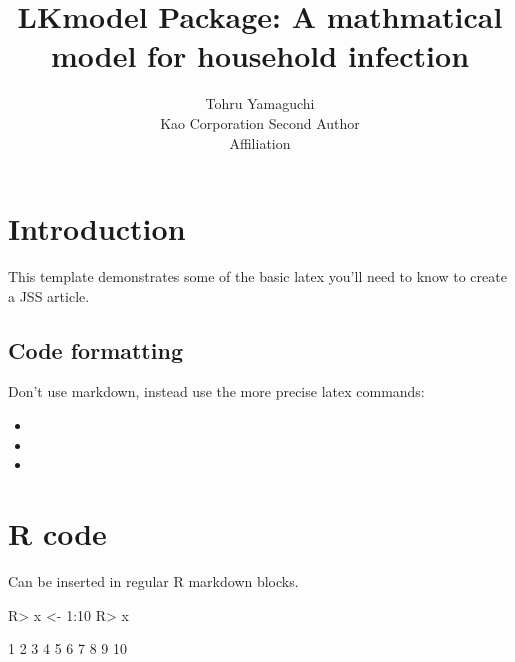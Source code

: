 \documentclass[article]{jss}
\author{
Tohru Yamaguchi\\Kao Corporation \And Second Author\\Affiliation
}
\title{LKmodel Package: A mathmatical model for household infection
\pkg{LKmodel}}
\begin{document}
\hypertarget{introduction}{%
\section{Introduction}\label{introduction}}

This template demonstrates some of the basic latex you'll need to know
to create a JSS article.

\hypertarget{code-formatting}{%
\subsection{Code formatting}\label{code-formatting}}

Don't use markdown, instead use the more precise latex commands:

\begin{itemize}
\item
\item
\item
\end{itemize}

\hypertarget{r-code}{%
\section{R code}\label{r-code}}

Can be inserted in regular R markdown blocks.

\begin{CodeChunk}

\begin{CodeInput}
R> x <- 1:10
R> x
\end{CodeInput}

\begin{CodeOutput}
 [1]  1  2  3  4  5  6  7  8  9 10
\end{CodeOutput}
\end{CodeChunk}
\end{document}
